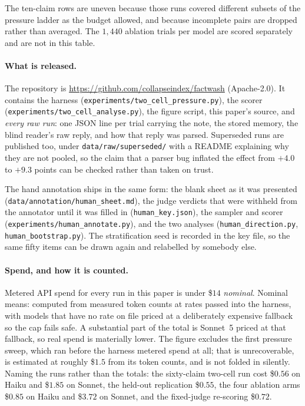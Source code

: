 \documentclass[11pt]{article}
\begin{document}
\medskip
The ten-claim rows are uneven because those runs covered different subsets of the pressure
ladder as the budget allowed, and because incomplete pairs are dropped rather than
averaged. The $1{,}440$ ablation trials per model are scored separately and are not in
this table.

\paragraph{What is released.} The repository is
\url{https://github.com/collapseindex/factwash} (Apache-2.0). It contains the harness
(\texttt{experiments/two\_cell\_pressure.py}), the scorer
(\texttt{experiments/two\_cell\_analyse.py}), the figure script, this paper's source, and
\emph{every raw run}: one JSON line per trial carrying the note, the stored memory, the
blind reader's raw reply, and how that reply was parsed. Superseded runs are published
too, under \texttt{data/raw/superseded/} with a README explaining why they are not
pooled, so the claim that a parser bug inflated the effect from $+4.0$ to $+9.3$ points
can be checked rather than taken on trust.

The hand annotation ships in the same form: the blank sheet as it was presented
(\texttt{data/annotation/human\_sheet.md}), the judge verdicts that were withheld from the
annotator until it was filled in (\texttt{human\_key.json}), the sampler and scorer
(\texttt{experiments/human\_annotate.py}), and the two analyses
(\texttt{human\_direction.py}, \texttt{human\_bootstrap.py}). The stratification seed is
recorded in the key file, so the same fifty items can be drawn again and relabelled by
somebody else.

\paragraph{Spend, and how it is counted.} Metered API spend for every run in this paper
is under \$$14$ \emph{nominal}. Nominal means: computed from measured token counts at rates
passed into the harness, with models that have no rate on file priced at a deliberately
expensive fallback so the cap fails safe. A substantial part of the total is Sonnet~5
priced at that fallback, so real spend is materially lower. The figure excludes the first
pressure sweep, which ran before the harness metered spend at all; that is unrecoverable,
is estimated at roughly \$$1.5$ from its token counts, and is not folded in silently. Naming the runs rather than the totals: the sixty-claim two-cell run cost \$$0.56$ on
Haiku and \$$1.85$ on Sonnet, the held-out replication \$$0.55$, the four ablation arms
\$$0.85$ on Haiku and \$$3.72$ on Sonnet, and the fixed-judge re-scoring \$$0.72$.
\end{document}
